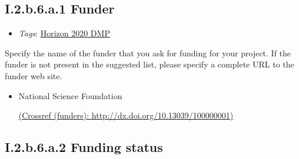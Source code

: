 \documentclass[a4paper,12pt]{report}
\begin{document}
\subsection*{\protect\textcolor{colorSecId}{I.2.b.6.a.1} Funder}

\label{1e85da40-bbfc-4180-903e-6c569ed2da38.c3dabaaf-c946-4a0d-889c-ede966f97667.afc53854-30c4-4236-a5be-7e49ad186b95.36a87eac-402d-43fb-a0df-ac5963bdf87d.c7be7c76-46fa-4a86-a9c9-ed2f0102178e.0b12fb8c-ee0f-40c0-9c53-b6826b786a0c}


\begin{itemize}
  \item \textit{Tags}: \ul{Horizon 2020 DMP}
  \end{itemize}


\noindent
\begin{markdown}
Specify the name of the funder that you ask for funding for your project. If the funder is not present in the suggested list, please specify a complete URL to the funder web site.

\end{markdown}



\begin{itemize}
  \item[\CheckmarkBold]
  \begin{markdown}
  National Science Foundation
  \end{markdown}
  \href{http://dx.doi.org/10.13039/100000001}{(Crossref (funders): http://dx.doi.org/10.13039/100000001)}
  
\end{itemize}


\subsection*{\protect\textcolor{colorSecId}{I.2.b.6.a.2} Funding status}

\label{1e85da40-bbfc-4180-903e-6c569ed2da38.c3dabaaf-c946-4a0d-889c-ede966f97667.afc53854-30c4-4236-a5be-7e49ad186b95.36a87eac-402d-43fb-a0df-ac5963bdf87d.c7be7c76-46fa-4a86-a9c9-ed2f0102178e.54ff3b18-652f-4235-8f9f-3c87e2d63169}
\end{document}
